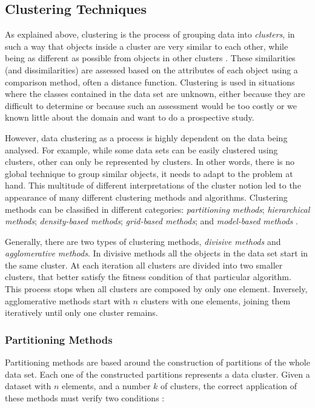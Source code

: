 \subsection{Clustering Techniques}\label{sec:clustertech}

As explained above, clustering is the process of grouping data into
\emph{clusters}, in such a way that objects inside a cluster are very similar to
each other, while being as different as possible from objects in other clusters
\cite{han2006data}. These similarities (and dissimilarities) are assessed based
on the attributes of each object using a comparison method, often a distance
function. Clustering is used in situations where the classes contained in the
data set are unknown, either because they are difficult to determine or because
such an assessment would be too costly or we known little about the domain and
want to do a prospective study.

However, data clustering as a process is highly dependent on the data being
analysed. For example, while some data sets can be easily clustered using
 clusters, other can only be represented by  clusters.
In other words, there is no global technique to group similar objects, it needs
to adapt to the problem at hand. This multitude of different interpretations of
the cluster notion led to the appearance of many different clustering methods
and algorithms. Clustering methods can be classified in different categories:
\emph{partitioning methods}; \emph{hierarchical methods}; \emph{density-based
methods}; \emph{grid-based methods}; and \emph{model-based methods}
\cite{han2006data}.

Generally, there are two types of clustering methods, \emph{divisive methods}
and \emph{agglomerative methods}. In divisive methods all the objects in the
data set start in the same cluster. At each iteration all clusters are divided
into two smaller clusters, that better satisfy the fitness condition of that
particular algorithm. This process stops when all clusters are composed by only
one element. Inversely, agglomerative methods start with $n$ clusters with one
elements, joining them iteratively until only one cluster remains.

\subsubsection*{Partitioning Methods}

Partitioning methods are based around the construction of partitions of the
whole data set. Each one of the constructed partitions represents a data
cluster. Given a dataset with $n$ elements, and a number $k$ of clusters, the
correct application of these methods must verify two conditions
\cite{han2006data}:\\

